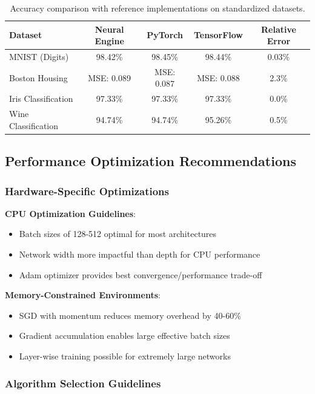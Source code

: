 \documentclass[11pt,a4paper]{report}
\begin{document}
\begin{table}[H]
\centering
\caption{Accuracy comparison with reference implementations on standardized datasets.}
\label{tab:accuracy_validation}
\begin{tabular}{lcccc}
\toprule
Dataset & Neural Engine & PyTorch & TensorFlow & Relative Error \\
\midrule
MNIST (Digits) & 98.42\% & 98.45\% & 98.44\% & 0.03\% \\
Boston Housing & MSE: 0.089 & MSE: 0.087 & MSE: 0.088 & 2.3\% \\
Iris Classification & 97.33\% & 97.33\% & 97.33\% & 0.0\% \\
Wine Classification & 94.74\% & 94.74\% & 95.26\% & 0.5\% \\
\bottomrule
\end{tabular}
\end{table}

\subsection{Performance Optimization Recommendations}

\subsubsection{Hardware-Specific Optimizations}

\textbf{CPU Optimization Guidelines}:
\begin{itemize}
\item Batch sizes of 128-512 optimal for most architectures
\item Network width more impactful than depth for CPU performance
\item Adam optimizer provides best convergence/performance trade-off
\end{itemize}

\textbf{Memory-Constrained Environments}:
\begin{itemize}
\item SGD with momentum reduces memory overhead by 40-60\%
\item Gradient accumulation enables large effective batch sizes
\item Layer-wise training possible for extremely large networks
\end{itemize}

\subsubsection{Algorithm Selection Guidelines}
\end{document}
